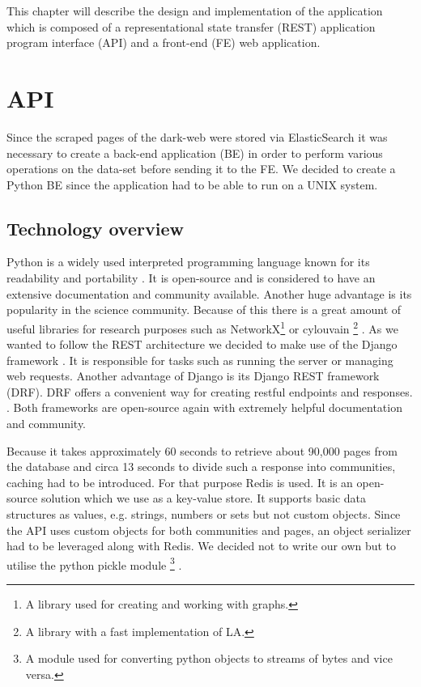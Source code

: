 This chapter will describe the design and implementation of the application which is composed of a representational state transfer (REST) application program interface (API) and a front-end (FE) web application. 

\section{API}
Since the scraped pages of the dark-web were stored via ElasticSearch it was necessary to create a back-end application (BE) in order to perform various operations on the data-set before sending it to the FE. We decided to create a Python BE since the application had to be able to run on a UNIX system. 
\subsection{Technology overview}
Python is a widely used interpreted programming language known for its  readability and portability \cite{aboutPython}. It is open-source and is considered to have an extensive documentation and community available. Another huge advantage is its popularity in the science community. Because of this there is a great amount of useful libraries for research purposes such as NetworkX\footnote{A library used for creating and working with graphs.} \cite{networkX} or cylouvain \footnote{A library with a fast implementation of LA.} \cite{cylouvain}.  
As we wanted to follow the REST architecture we decided to make use of the Django framework \cite{meetDjango}. It is responsible for tasks such as running the server or managing web requests. Another advantage of Django is its Django REST framework (DRF). DRF offers a convenient way for creating restful endpoints and responses. \cite{djangoRest}. Both frameworks are open-source again with extremely helpful documentation and community. 

Because it takes approximately 60 seconds to retrieve about 90,000 pages from the database and circa 13 seconds to divide such a response into communities, caching had to be introduced. For that purpose Redis \cite{redis} is used. It is an open-source solution which we use as a key-value store. It supports  basic data structures as values, e.g. strings, numbers or sets but not custom objects. Since the API uses custom objects for both communities and pages, an object serializer had to be leveraged along with Redis. We decided not to write our own but to utilise the python pickle module \footnote{A module used for converting python objects to streams of bytes and vice versa.} \cite{pickle}. 

